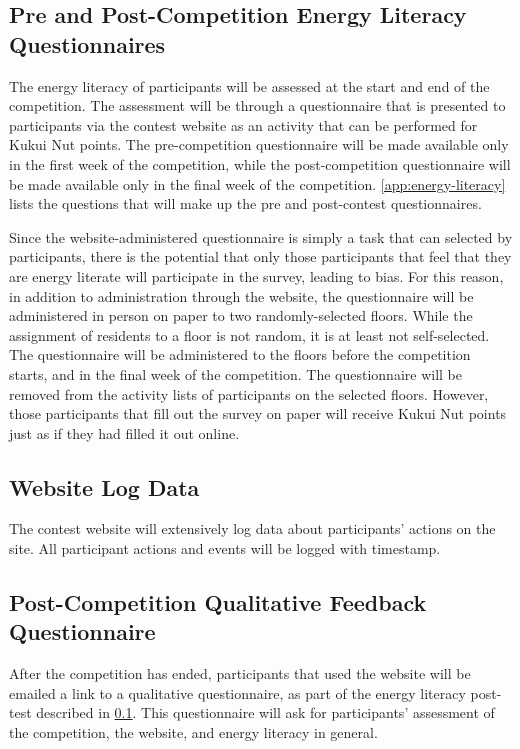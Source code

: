 \subsection{Pre and Post-Competition Energy Literacy Questionnaires}
\label{sec:exp-literacy-questionnaire}

The energy literacy of participants will be assessed at the start and end of the competition. The assessment will be through a questionnaire that is presented to participants via the contest website as an activity that can be performed for Kukui Nut points. The pre-competition questionnaire will be made available only in the first week of the competition, while the post-competition questionnaire will be made available only in the final week of the competition. \autoref{app:energy-literacy} lists the questions that will make up the pre and post-contest questionnaires.

Since the website-administered questionnaire is simply a task that can selected by participants, there is the potential that only those participants that feel that they are energy literate will participate in the survey, leading to bias. For this reason, in addition to administration through the website, the questionnaire will be administered in person on paper to two randomly-selected floors. While the assignment of residents to a floor is not random, it is at least not self-selected. The questionnaire will be administered to the floors before the competition starts, and in the final week of the competition. The questionnaire will be removed from the activity lists of participants on the selected floors. However, those participants that fill out the survey on paper will receive Kukui Nut points just as if they had filled it out online.

\subsection{Website Log Data}

The contest website will extensively log data about participants' actions on the site. All participant actions and events will be logged with timestamp.

\subsection{Post-Competition Qualitative Feedback Questionnaire}

After the competition has ended, participants that used the website will be emailed a link to a qualitative questionnaire, as part of the energy literacy post-test described in \ref{sec:exp-literacy-questionnaire}. This questionnaire will ask for participants' assessment of the competition, the website, and energy literacy in general.

